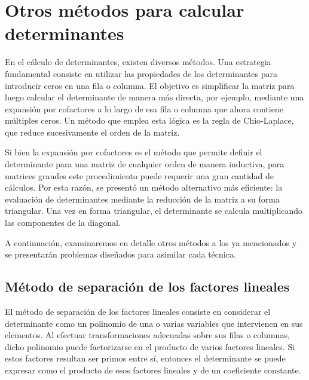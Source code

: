 \newpage

\section{Otros métodos para calcular determinantes}

En el cálculo de determinantes, existen diversos métodos. Una estrategia fundamental consiste en utilizar las propiedades de los determinantes para introducir ceros en una fila o columna. El objetivo es simplificar la matriz para luego calcular el determinante de manera más directa, por ejemplo, mediante una expansión por cofactores a lo largo de esa fila o columna que ahora contiene múltiples ceros. Un método que emplea esta lógica es la regla de Chio-Laplace, que reduce sucesivamente el orden de la matriz.

Si bien la expansión por cofactores es el método que permite definir el determinante para una matriz de cualquier orden de manera inductiva, para matrices grandes este procedimiento puede requerir una gran cantidad de cálculos. Por esta razón, se presentó un método alternativo más eficiente: la evaluación de determinantes mediante la reducción de la matriz a su forma triangular. Una vez en forma triangular, el determinante se calcula multiplicando las componentes de la diagonal.

A continuación, examinaremos en detalle otros métodos a los ya mencionados y se presentarán problemas diseñados para asimilar cada técnica.

\subsection*{Método de separación de los factores lineales}

El método de separación de los factores lineales consiste en considerar el determinante como un polinomio de una o varias variables que intervienen en sus elementos. Al efectuar transformaciones adecuadas sobre sus filas o columnas, dicho polinomio puede factorizarse en el producto de varios factores lineales. Si estos factores resultan ser primos entre sí, entonces el determinante se puede expresar como el producto de esos factores lineales y de un coeficiente constante.

